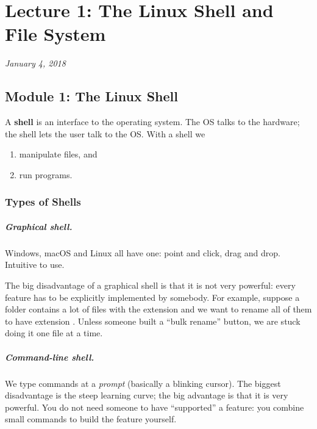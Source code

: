 \chapter{Lecture 1: The Linux Shell and File System}
\begin{center}
\textit{January 4, 2018}
\end{center}

\section{Module 1: The Linux Shell}

\begin{definition}
A \textbf{shell} is an interface to the operating system. The OS talks to the
hardware; the shell lets the user talk to the OS. With a shell we
\begin{enumerate}
  \item manipulate files, and
  \item run programs.
\end{enumerate}
\end{definition}

\subsection{Types of Shells}

\paragraph{Graphical shell.} Windows, macOS and Linux all have one: point and
click, drag and drop. Intuitive to use.

The big disadvantage of a graphical shell is that it is not very powerful:
every feature has to be explicitly implemented by somebody. For example, suppose
a folder contains a lot of files with the extension  and we want to
rename all of them to have extension . Unless someone built a ``bulk
rename'' button, we are stuck doing it one file at a time.

\paragraph{Command-line shell.} We type commands at a \emph{prompt} (basically
a blinking cursor). The biggest disadvantage is the steep learning curve; the big
advantage is that it is very powerful. You do not need someone to have
``supported'' a feature: you combine small commands to build the feature
yourself.

